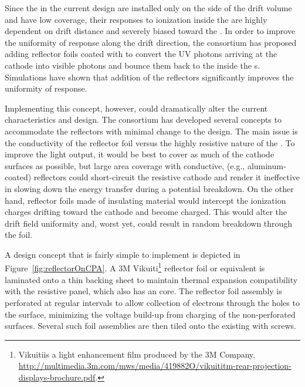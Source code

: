 Since the  in the current  design are installed only on the  side of the drift volume and have low coverage, their responses to ionization inside the  are highly dependent on drift distance and severely biased toward the .  In order to improve the uniformity of response along the drift direction, the  consortium has proposed adding reflector foils coated with  to convert the UV photons arriving at the cathode into visible photons and bounce them back to the  inside the s.  Simulations have shown that addition of the reflectors  significantly improves the uniformity of response.

Implementing this concept, however, could dramatically alter the current  characteristics and design.  The  consortium has %
developed several concepts to accommodate the reflectors with minimal change to the %
 design.  The main issue %
is the conductivity of the reflector foil versus the highly resistive nature of the .  To improve the light output, it would be best to %
cover as much of the cathode surfaces as possible, but %
large area coverage with conductive, (e.g., aluminum-coated) reflectors could short-circuit the resistive cathode and render it ineffective in slowing down the energy transfer during a potential  breakdown.  On the other hand, %
reflector foils made of insulating material would intercept the ionization charges drifting toward the cathode and become charged. This would alter the drift field uniformity and, worst yet, could result in random breakdown through the foil.

A design concept that is fairly simple to implement %
is depicted in Figure~\ref{fig:reflectorOnCPA}.  A 3M Vikuiti\footnote{Vikuiti\texttrademark is a light enhancement film produced by the 3M Company,  \url{http://multimedia.3m.com/mws/media/419882O/vikuititm-rear-projection-displays-brochure.pdf}.} 
reflector foil or equivalent is laminated onto a thin \frfour backing sheet to maintain thermal expansion compatibility
with the resistive  panel, which also has an \frfour core. The reflector foil assembly is perforated at regular intervals to allow %
collection of electrons through the holes to the   surface, minimizing the voltage build-up from charging of the non-perforated surfaces.  Several such foil assemblies are then tiled onto the existing  with screws.

